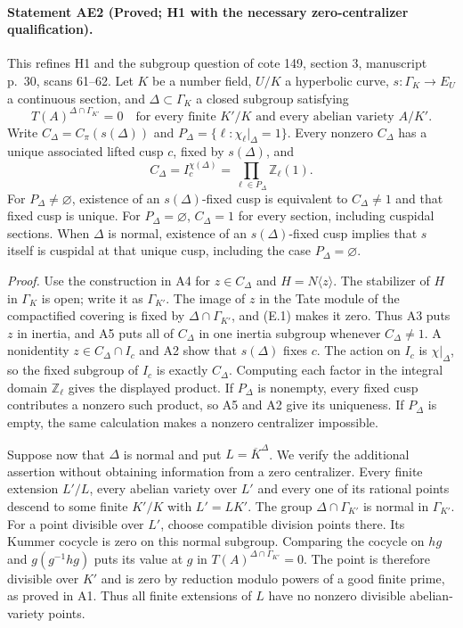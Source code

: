\paragraph{Statement AE2 (Proved; H1 with the necessary zero-centralizer qualification).}\label{res:AE2}
This refines H1 and the subgroup question of cote 149, section 3, manuscript p.~30, scans 61--62.
Let $K$ be a number field, $U/K$ a hyperbolic curve, $s:\Gamma_K\to E_U$ a continuous section, and $\Delta\subset\Gamma_K$ a closed subgroup satisfying
\[
 T(A)^{\Delta\cap\Gamma_{K'}}=0
 \quad\text{for every finite }K'/K\text{ and every abelian variety }A/K'.\tag{E.1}
\]
Write $C_\Delta=C_\pi(s(\Delta))$ and
$P_\Delta=\{\ell:\chi_\ell|_\Delta=1\}$. Every nonzero $C_\Delta$ has a unique associated lifted cusp $c$, fixed by $s(\Delta)$, and
\[
 C_\Delta=I_c^{\chi(\Delta)}
 =\prod_{\ell\in P_\Delta}\mathbb Z_\ell(1).
\]
For $P_\Delta\ne\varnothing$, existence of an $s(\Delta)$-fixed cusp is equivalent to $C_\Delta\ne1$ and that fixed cusp is unique. For $P_\Delta=\varnothing$, $C_\Delta=1$ for every section, including cuspidal sections. When $\Delta$ is normal, existence of an $s(\Delta)$-fixed cusp implies that $s$ itself is cuspidal at that unique cusp, including the case $P_\Delta=\varnothing$.

\emph{Proof.} Use the construction in A4 for $z\in C_\Delta$ and $H=N\langle z\rangle$. The stabilizer of $H$ in $\Gamma_K$ is open; write it as $\Gamma_{K'}$. The image of $z$ in the Tate module of the compactified covering is fixed by $\Delta\cap\Gamma_{K'}$, and (E.1) makes it zero. Thus A3 puts $z$ in inertia, and A5 puts all of $C_\Delta$ in one inertia subgroup whenever $C_\Delta\ne1$. A nonidentity $z\in C_\Delta\cap I_c$ and A2 show that $s(\Delta)$ fixes $c$. The action on $I_c$ is $\chi|_\Delta$, so the fixed subgroup of $I_c$ is exactly $C_\Delta$. Computing each factor in the integral domain $\mathbb Z_\ell$ gives the displayed product. If $P_\Delta$ is nonempty, every fixed cusp contributes a nonzero such product, so A5 and A2 give its uniqueness. If $P_\Delta$ is empty, the same calculation makes a nonzero centralizer impossible.

Suppose now that $\Delta$ is normal and put $L=\overline K^{\Delta}$. We verify the additional assertion without obtaining information from a zero centralizer. Every finite extension $L'/L$, every abelian variety over $L'$ and every one of its rational points descend to some finite $K'/K$ with $L'=LK'$. The group $\Delta\cap\Gamma_{K'}$ is normal in $\Gamma_{K'}$. For a point divisible over $L'$, choose compatible division points there. Its Kummer cocycle is zero on this normal subgroup. Comparing the cocycle on $hg$ and $g(g^{-1}hg)$ puts its value at $g$ in $T(A)^{\Delta\cap\Gamma_{K'}}=0$. The point is therefore divisible over $K'$ and is zero by reduction modulo powers of a good finite prime, as proved in A1. Thus all finite extensions of $L$ have no nonzero divisible abelian-variety points.

